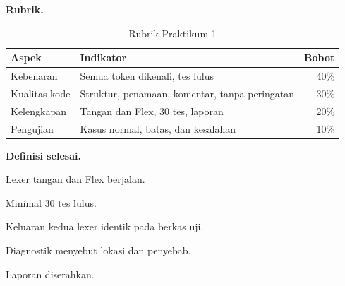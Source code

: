 \textbf{Rubrik.}
\begin{table}[H]
\centering
\caption{Rubrik Praktikum 1}
\label{tab:ch07-rubrik}
\begin{tabularx}{\textwidth}{@{}lXr@{}}
\toprule
\textbf{Aspek} & \textbf{Indikator} & \textbf{Bobot} \\
\midrule
Kebenaran & Semua token dikenali, tes lulus & 40\% \\
Kualitas kode & Struktur, penamaan, komentar, tanpa peringatan & 30\% \\
Kelengkapan & Tangan dan Flex, 30 tes, laporan & 20\% \\
Pengujian & Kasus normal, batas, dan kesalahan & 10\% \\
\bottomrule
\end{tabularx}
\end{table}

\textbf{Definisi selesai.}
\begin{checklist}
  \item Lexer tangan dan Flex berjalan.
  \item Minimal 30 tes lulus.
  \item Keluaran kedua lexer identik pada berkas uji.
  \item Diagnostik menyebut lokasi dan penyebab.
  \item Laporan diserahkan.
\end{checklist}
